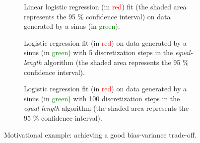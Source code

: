 \begin{figure}[!ht]
\begin{subfigure}[t]{\textwidth}
\centering \resizebox{.8\textwidth}{!}{}
\caption{\label{fig:sinus_lin} Linear logistic regression (in \textcolor{red}{red}) fit (the shaded area represents the 95 \% confidence interval) on data generated by a sinus (in \textcolor{green}{green}).}
\end{subfigure}
\begin{subfigure}[t]{\textwidth}
\centering \resizebox{.8\textwidth}{!}{}
\caption{\label{fig:sinus_deb} Logistic regression fit (in \textcolor{red}{red}) on data generated by a sinus (in \textcolor{green}{green}) with 5 discretization steps in the \textit{equal-length} algorithm (the shaded area represents the 95 \% confidence interval).}
\end{subfigure}
\begin{subfigure}[t]{\textwidth}
\centering \resizebox{.8\textwidth}{!}{}
\caption{\label{fig:sinus_fin} Logistic regression fit (in \textcolor{red}{red}) on data generated by a sinus (in \textcolor{green}{green}) with 100 discretization steps in the \textit{equal-length} algorithm (the shaded area represents the 95 \% confidence interval).}
\end{subfigure}
\caption{Motivational example: achieving a good bias-variance trade-off.}
\label{fig:sin_trois}
\end{figure}
 
